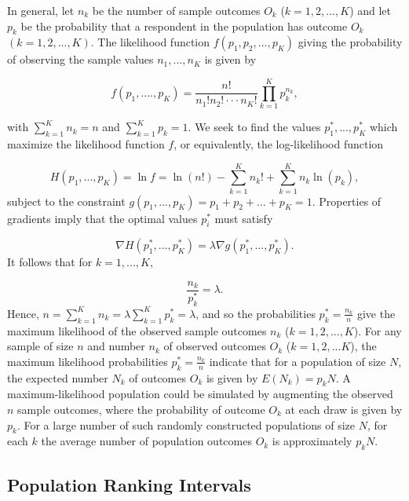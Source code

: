 \documentclass[a4paper, 12pt]{article}
\begin{document}
In general, let $n_k$ be the number of sample outcomes $O_k$ ($k=1,2,...,K$) and let $p_k$ be the probability that a respondent in the population  has outcome $O_k$ $(k= 1, 2, ..., K)$.  The likelihood function $f(p_1, p_2, ..., p_K)$ giving the probability of observing the sample values $n_1, ..., n_{K}$ is given by

\begin{equation}
f(p_1, ...., p_K)= \frac{n!}{n_1!n_2!\cdot\cdot\cdot n_K!} \prod_{k=1}^K p_k^{n_k},
\end{equation}
\label{eq:4}

{\flushleft with} $\sum_{k=1}^{K}n_k=n$ and $\sum_{k=1}^{K}p_k=1$.
We seek to find the values $p_1^*, ..., p_{K}^*$ which maximize the likelihood function $f$, or equivalently, the log-likelihood function

\begin{equation}
H(p_1, ..., p_K)=\ln f = \ln(n!) - \sum_{k=1}^{K} n_k! +\sum_{k=1}^{K} n_k\ln(p_k),
\end{equation}
\label{eq:5}
{\flushleft subject} to the constraint $g(p_1, ..., p_{K})=p_1+p_2+...+p_K=1$.  Properties of gradients imply that the optimal values $p_i^*$ must satisfy

\begin{equation}
\nabla H(p_1^*, ..., p_K^*) = \lambda \nabla g(p_1^*, ..., p_{K}^*).
\end{equation}
\label{eq:6}
{\flushleft It} follows that for $k=1, ..., K$,

\begin{equation}
\frac{n_k}{p_k^*}=\lambda.
\end{equation}
\label{eq:7}
{\flushleft Hence,} $n=\sum_{k=1}^{K} n_k =  \lambda \sum_{k=1}^{K} p_k^* = \lambda$, and so the probabilities $p_k^* = \frac{n_k}{n}$ give the maximum likelihood of the observed sample outcomes $n_k$ ($k=1, 2, ..., K$).  For any sample of size $n$ and number $n_k$ of observed outcomes $O_k$ ($k=1, 2, ...K$), the maximum likelihood probabilities $p_k^*=\frac{n_k}{n}$
indicate that for a population of size $N$, the expected number $N_k$ of outcomes $O_k$ is given by $E(N_k)=p_k N.$  A maximum-likelihood population could be simulated by augmenting the observed $n$ sample outcomes, where the probability of outcome $O_k$ at each draw is given by $p_k$.   For a large number of such randomly constructed populations of size $N$, for each $k$ the average number of population outcomes $O_k$ is approximately $p_k N$.



\subsection{Population Ranking Intervals}
\end{document}
